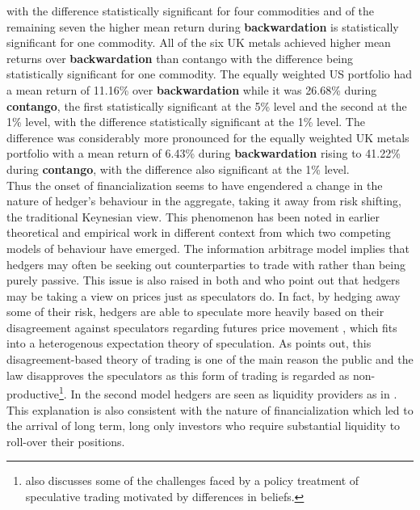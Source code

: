 \documentclass[12pt,]{article}
\let\rmarkdownfootnote\footnote%
\def\footnote{\protect\rmarkdownfootnote}
\begin{document}
with the difference statistically significant for four commodities and
of the remaining seven the higher mean return during
\textbf{backwardation} is statistically significant for one commodity.
All of the six UK metals achieved higher mean returns over
\textbf{backwardation} than contango with the difference being
statistically significant for one commodity. The equally weighted US
portfolio had a mean return of 11.16\% over \textbf{backwardation} while
it was 26.68\% during \textbf{contango}, the first statistically
significant at the 5\% level and the second at the 1\% level, with the
difference statistically significant at the 1\% level. The difference
was considerably more pronounced for the equally weighted UK metals
portfolio with a mean return of 6.43\% during \textbf{backwardation}
rising to 41.22\% during \textbf{contango}, with the difference also
significant at the 1\% level.\\
Thus the onset of financialization seems to have engendered a change in
the nature of hedger's behaviour in the aggregate, taking it away from
risk shifting, the traditional Keynesian view. This phenomenon has been
noted in earlier theoretical and empirical work
\citep[\citet{stout_why_1998}]{DanthineInformationfuturesprices1978} in
different context from which two competing models of behaviour have
emerged. The information arbitrage model implies that hedgers may often
be seeking out counterparties to trade with rather than being purely
passive. This issue is also raised in both
\citet{cheng_financialization_2014} and
\citet{StulzRethinkingriskmanagement1996} who point out that hedgers may
be taking a view on prices just as speculators do. In fact, by hedging
away some of their risk, hedgers are able to speculate more heavily
based on their disagreement against speculators regarding futures price
movement \citep{SimsekSpeculationrisksharing2013}, which fits into a
heterogenous expectation theory of speculation. As
\citet{stout_why_1998} points out, this disagreement-based theory of
trading is one of the main reason the public and the law disapproves the
speculators as this form of trading is regarded as
non-productive\footnote{\citet{DuffieChallengespolicytreatment2014} also
  discusses some of the challenges faced by a policy treatment of
  speculative trading motivated by differences in beliefs.}. In the
second model hedgers are seen as liquidity providers as in
\citet{Kangtaletwopremiums2017}. This explanation is also consistent
with the nature of financialization which led to the arrival of long
term, long only investors who require substantial liquidity to roll-over
their positions.
\end{document}
